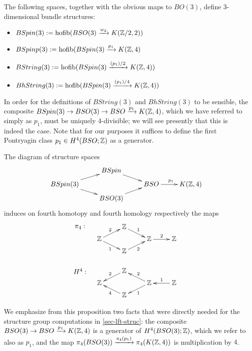 \documentclass{amsart}
\begin{document}
\begin{definition}
The following spaces, together with the obvious maps to $BO(3)$, define 3-dimensional bundle structures:
\begin{itemize}
\item[Spin:] $BSpin(3) := \operatorname{hofib}(BSO(3) \xrightarrow{w_2} K(\mathbb Z/2,2))$
\item[Spinp:] $BSpinp(3) := \operatorname{hofib}(BSpin(3) \xrightarrow{p_1} K(\mathbb Z,4)$
\item[String:] $BString(3) := \operatorname{hofib}(BSpin(3) \xrightarrow{(p_1)/2} K(\mathbb Z,4))$
\item[hString:] $BhString(3) := \operatorname{hofib}(BSpin(3) \xrightarrow{(p_1)/4} K(\mathbb Z,4))$
\end{itemize}
\end{definition}

\nid In order for the definitions of $BString(3)$ and $BhString(3)$ to be sensible, the composite $BSpin(3) \rightarrow BSO(3) \rightarrow BSO \xrightarrow{p_1} K(\mathbb Z,4)$, which we have referred to simply as $p_1$, must be uniquely 4-divisible; we will see presently that this is indeed the case.  Note that for our purposes it suffices to define the first Pontryagin class $p_1 \in H^4(BSO;\mathbb Z)$ as a generator.

\begin{proposition} 
\label{prop-H4}
The diagram of structure spaces
\[
\xymatrix@R=5pt{
& BSpin \ar[dr] & & \\
BSpin(3) \ar[ur] \ar[dr] && BSO \ar[r]^{p_1} & K(\ZZ,4) \\
& BSO(3) \ar[ur] & &
}
\]
induces on fourth homotopy and fourth homology respectively the maps
\[
\xymatrix@R=5pt{
\save[]+<-1cm,0cm>*{\pi_4:}\restore & \ZZ \ar[dr]^{1} & & \\
\ZZ \ar[ur]^{2} \ar[dr]_{1} && \ZZ \ar[r]^{2} & \ZZ \\
& \ZZ \ar[ur]_{2} & & \\
&&& \\
\save[]+<-1cm,0cm>*{H^4:}\restore & \ZZ \ar[dl]_{2} & & \\
\ZZ && \ZZ \ar[ul]_{2} \ar[dl]^{1} & \ZZ \ar[l]_{1} \\
& \ZZ \ar[ul]^{4} & &
}
\]
\end{proposition}

We emphasize from this proposition two facts that were directly needed for the structure group computations in \cref{sec-lft-struc}: the composite $BSO(3) \rightarrow BSO \xrightarrow{p_1} K(\mathbb Z,4)$ is a generator of $H^4(BSO(3);\mathbb Z)$, which we refer to also as $p_1$, and the map $\pi_4(BSO(3)) \xrightarrow{\pi_4(p_1)} \pi_4(K(\mathbb Z,4))$ is multiplication by $4$.
\end{document}
